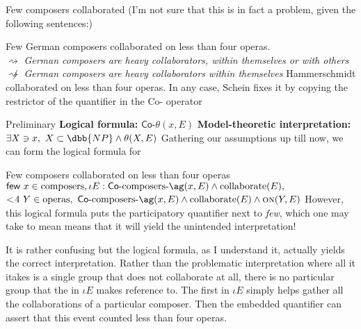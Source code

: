\ex
Few composers collaborated
\xe
%
(I'm not sure that this is in fact a problem, given the following sentences:)

\pex
\a 
Few German composers collaborated on less than four operas.\\
$\rightsquigarrow$ \emph{German composers are heavy collaborators, within themselves or with others}\\
$\not\rightsquigarrow$ \emph{German composers are heavy collaborators within themselves}
\a 
Hammerschmidt collaborated on less than four operas.
\xe
%
In any case, Schein fixes it by copying the restrictor of the quantifier in the \textsf{Co-} operator

\pex Preliminary
\a \textbf{Logical formula:}
$\textsf{Co-}\theta(x, E)$
\a \textbf{Model-theoretic interpretation:}\\
$\exists X\ni x,\ X\subset\dbb{NP}\wedge \theta (X, E)$
\xe
%
Gathering our assumptions up till now, we can form the logical formula for \cnextxa

\pex
\a 
Few composers collaborated on less than four operas
\a 
$\textsf{few }x\in\text{composers}, \iota E: \textsf{Co}\text{-composers-}\ag(x, E)\wedge \text{collaborate}(E),$ \\
$<\!4\ Y\in\text{operas},\ \textsf{Co}\text{-composers-}\ag(x, E) \wedge \text{collaborate}(E)\wedge \textsc{on}(Y, E) $
\xe
%
However, this logical formula puts the participatory quantifier next to \emph{few}, which one may take to mean means that it will yield the unintended interpretation! 

It is rather confusing but the logical formula, as I understand it, actually yields the correct interpretation. 
Rather than the problematic interpretation where all it itakes is a single group that does not collaborate at all, there is no particular group that the \ag in $\iota E$ makes reference to. The first \ag in  $\iota E$ simply helps gather all the collaborations of a particular composer. Then the embedded quantifier can assert that this event counted less than four operas.




